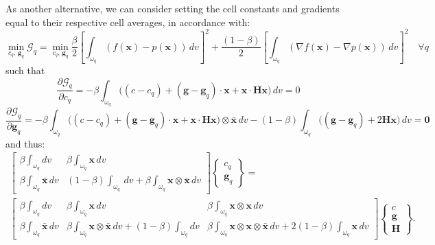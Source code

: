 \documentclass[11pt]{article} %
\begin{document}
As another alternative, we can consider setting the cell constants and gradients equal to their respective cell averages, in accordance with:
\begin{equation}
	\min_{c_q, \, \mathbf{g}_q} \mathcal{G}_q = \min_{c_q, \, \mathbf{g}_q} \frac{\beta}{2} \left[ \int_{\omega_q} (f(\mathbf{x}) - p(\mathbf{x})) \, dv \right]^2 + \frac{(1-\beta)}{2} \left[ \int_{\omega_q} (\nabla f(\mathbf{x}) - \nabla p(\mathbf{x})) \, dv \right]^2 \quad \forall q
\end{equation}
such that
\begin{equation}
	\frac{\partial \mathcal{G}_q}{\partial c_q} = - \beta \int_{\omega_q} \big( (c - c_q) + (\mathbf{g} - \mathbf{g}_q ) \cdot \mathbf{x} + \mathbf{x} \cdot \mathbf{H} \mathbf{x} \big) \, dv = 0
\end{equation}
\begin{equation}
	\frac{\partial \mathcal{G}_q}{\partial \mathbf{g}_q} = - \beta \int_{\omega_q} \big( (c - c_q) + (\mathbf{g} - \mathbf{g}_q ) \cdot \mathbf{x} + \mathbf{x} \cdot \mathbf{H} \mathbf{x} \big) \otimes \bar{\mathbf{x}} \, dv - (1-\beta) \int_{\omega_q} \big( (\mathbf{g} - \mathbf{g}_q ) + 2 \mathbf{H} \mathbf{x} \big) \, dv = \mathbf{0}
\end{equation}
and thus:
\begin{eqnarray}
	\left[ \begin{array}{cc} \beta \int_{\omega_q} dv & \beta \int_{\omega_q} \mathbf{x} \, dv \\ \beta \int_{\omega_q} \bar{\mathbf{x}} \, dv & (1-\beta) \int_{\omega_q} \, dv + \beta \int_{\omega_q} \mathbf{x} \otimes \bar{\mathbf{x}} \, dv \end{array} \right] \left\{ \begin{array}{c} c_q \\ \mathbf{g}_q \end{array} \right\} \nonumber = \\ \left[ \begin{array}{ccc} \beta \int_{\omega_q} dv & \beta \int_{\omega_q} \mathbf{x} \, dv & \beta \int_{\omega_q} \mathbf{x} \otimes \mathbf{x} \, dv \\ \beta \int_{\omega_q} \bar{\mathbf{x}} \, dv & \beta \int_{\omega_q} \mathbf{x} \otimes \bar{\mathbf{x}} \, dv + (1 - \beta) \int_{\omega_q} dv & \beta \int_{\omega_q} \mathbf{x} \otimes \mathbf{x} \otimes \bar{\mathbf{x}} \, dv + 2 (1-\beta) \int_{\omega_q} \mathbf{x} \, dv \end{array} \right] \left\{ \begin{array}{c} c \\ \mathbf{g} \\ \mathbf{H} \end{array} \right\} . \nonumber
\end{eqnarray}
\end{document}
